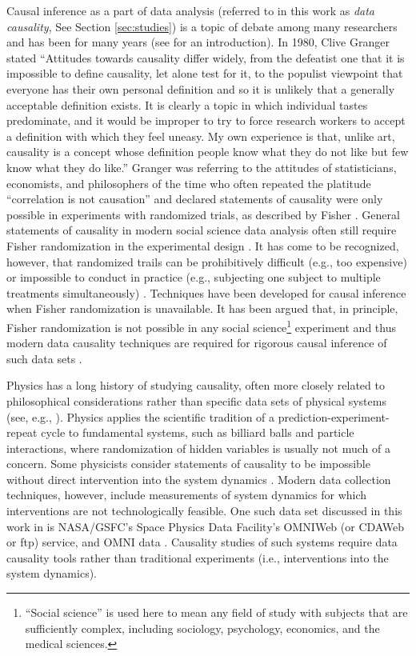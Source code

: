 Causal inference as a part of data analysis (referred to in this work as {\em data causality}, See Section \ref{sec:studies}) is a topic of debate among many researchers and has been for many years (see \cite{Illari2014} for an introduction).  In 1980, Clive Granger stated ``Attitudes towards causality differ widely, from the defeatist one that it is impossible to define causality, let alone test for it, to the populist viewpoint that everyone has their own personal definition and so it is unlikely that a generally acceptable definition exists. It is clearly a topic in which individual tastes predominate, and it would be improper to try to force research workers to accept a definition with which they feel uneasy. My own experience is that, unlike art, causality is a concept whose definition people know what they do not like but few know what they do like.'' \cite{Granger1980}  Granger was referring to the attitudes of statisticians, economists, and philosophers of the time who often repeated the platitude ``correlation is not causation'' \cite{Granger2003} and declared statements of causality were only possible in experiments with randomized trials, as described by Fisher \cite{Fisher1934,Fisher1960}.  General statements of causality in modern social science data analysis often still require Fisher randomization in the experimental design \cite{Imbens2015,Morgan2014}.  It has come to be recognized, however, that randomized trails can be prohibitively difficult (e.g., too expensive) or impossible to conduct in practice (e.g., subjecting one subject to multiple treatments simultaneously) \cite{Morgan2014,Imbens2015}.  Techniques have been developed for causal inference when Fisher randomization is unavailable.  It has been argued that, in principle, Fisher randomization is not possible in any social science\footnote{``Social science'' is used here to mean any field of study with subjects that are sufficiently complex, including sociology, psychology, economics, and the medical sciences.} experiment and thus modern data causality techniques are required for rigorous causal inference of such data sets \cite{Illari2011b}.

Physics has a long history of studying causality, often more closely related to philosophical considerations rather than specific data sets of physical systems (see, e.g., \cite{Bohm1971}).  Physics applies the scientific tradition of a prediction-experiment-repeat cycle \cite{Godfrey2009} to fundamental systems, such as billiard balls and particle interactions, where randomization of hidden variables is usually not much of a concern.  Some physicists consider statements of causality to be impossible without direct intervention into the system dynamics \cite{Bunge1979}.  Modern data collection techniques, however, include measurements of system dynamics for which interventions are not technologically feasible.  One such data set discussed in this work in is NASA/GSFC's Space Physics Data Facility's OMNIWeb (or CDAWeb or ftp) service, and OMNI data \cite{King2005}.  Causality studies of such systems require data causality tools rather than traditional experiments (i.e., interventions into the system dynamics).  

